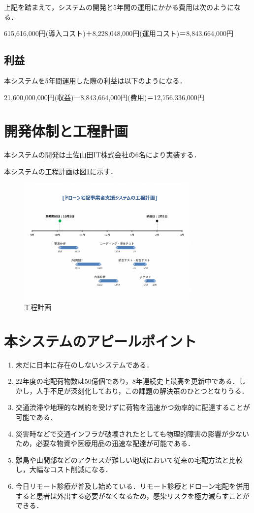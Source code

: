 \documentclass[a4paper, titlepage]{jsarticle}
\begin{document}
上記を踏まえて，システムの開発と5年間の運用にかかる費用は次のようになる．
\begin{center}
  615,616,000円(導入コスト)＋8,228,048,000円(運用コスト)＝8,843,664,000円
\end{center}

\subsection{利益}
本システムを5年間運用した際の利益は以下のようになる．
\begin{center}
  21,600,000,000円(収益)－8,843,664,000円(費用)＝12,756,336,000円
\end{center}

\section{開発体制と工程計画}
本システムの開発は土佐山田IT株式会社の6名により実装する．

本システムの工程計画は図\ref{fig:schedule}に示す．
\begin{figure}[htbp]
  \centering
  \includegraphics[width=0.8\textwidth]{schedule.pdf}
  \caption{工程計画}
  \label{fig:schedule}
\end{figure}

\section{本システムのアピールポイント}
\begin{enumerate}
  \item 未だに日本に存在のしないシステムである．
  \item 22年度の宅配荷物数は50億個であり，8年連続史上最高を更新中である．しかし，人手不足が深刻化しており，この課題の解決策のひとつとなりうる．
  \item 交通渋滞や地理的な制約を受けずに荷物を迅速かつ効率的に配達することが可能である．
  \item 災害時などで交通インフラが破壊されたとしても物理的障害の影響が少ないため，必要な物資や医療用品の迅速な配達が可能である．
  \item 離島や山間部などのアクセスが難しい地域において従来の宅配方法と比較し，大幅なコスト削減になる．
  \item 今日リモート診療が普及し始めている．リモート診療とドローン宅配を併用すると患者は外出する必要がなくなるため，感染リスクを極力減らすことができる．
\end{enumerate}
\end{document}
